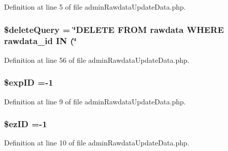 Definition at line 5 of file admin\-Rawdata\-Update\-Data.\-php.

\hypertarget{admin_rawdata_update_data_8php_ad08dc0a05af9c3e0730669485af92e41}{
\subsubsection[{\$delete\-Query}]{\setlength{\rightskip}{0pt plus 5cm}\$delete\-Query = \char`\"{}D\-E\-L\-E\-T\-E F\-R\-O\-M rawdata W\-H\-E\-R\-E rawdata\-\_\-id I\-N (\char`\"{}}}\label{admin_rawdata_update_data_8php_ad08dc0a05af9c3e0730669485af92e41}


Definition at line 56 of file admin\-Rawdata\-Update\-Data.\-php.

\hypertarget{admin_rawdata_update_data_8php_ae384d32e62e85e587cd27bf249ed3db3}{
\subsubsection[{\$exp\-I\-D}]{\setlength{\rightskip}{0pt plus 5cm}\${\bf exp\-I\-D} =-\/1}}\label{admin_rawdata_update_data_8php_ae384d32e62e85e587cd27bf249ed3db3}


Definition at line 9 of file admin\-Rawdata\-Update\-Data.\-php.

\hypertarget{admin_rawdata_update_data_8php_addb1ec3ba55e413a08cb006ce21974df}{
\subsubsection[{\$ez\-I\-D}]{\setlength{\rightskip}{0pt plus 5cm}\${\bf ez\-I\-D} =-\/1}}\label{admin_rawdata_update_data_8php_addb1ec3ba55e413a08cb006ce21974df}


Definition at line 10 of file admin\-Rawdata\-Update\-Data.\-php.

